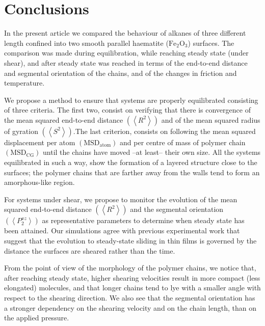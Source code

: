 \documentclass[aps,prb,reprint,superscriptaddress, a4paper]{revtex4-1}
\begin{document}

\section{Conclusions}
\label{sec:Conc}

In the present article we compared the behaviour of alkanes of three different length confined into two smooth parallel haematite ($\text{Fe}_2\text{O}_3$) surfaces. The comparison was made during equilibration, while reaching steady state (under shear), and after steady state was reached in terms of the end-to-end distance and segmental orientation of the chains, and of the changes in friction and temperature.

We propose a method to ensure that systems are properly equilibrated consisting of three criteria. The first two, consist on verifying that there is convergence of the mean squared end-to-end distance $\left(\left< R^2 \right> \right)$ and of  the mean squared radius of gyration $\left(\left< S^2 \right> \right)$.The last criterion, consists on following the mean squared displacement per atom $\left(\text{MSD}_{\text{atom}}\right)$ and per centre of mass of polymer chain $\left(\text{MSD}_{\text{CG}}\right)$ until the chains have moved --at least-- their own size\cite{Auhl2003}. All the systems equilibrated in such a way, show the formation of a  layered structure close to the surfaces; the polymer chains that are farther away  from the walls tend to form an amorphous-like region. 

For systems under shear, we propose to monitor the evolution of the mean squared end-to-end distance $\left(\left< R^2 \right> \right)$ and the segmental orientation $\left(\left<P_{2}^{xz} \right> \right)$ as representative parameters to determine when steady state has been attained. Our simulations  agree with previous experimental work that suggest\cite{Drummond2000} that the  evolution to steady-state sliding in thin films is governed by the distance the surfaces are sheared rather than the time.

From the point of view of the morphology of the polymer chains, we notice that, after reaching steady state, higher shearing velocities result in more compact (less elongated) molecules, and that longer chains tend to  lye  with a smaller angle with respect to the shearing direction.  We also see that the segmental orientation has a stronger dependency on the shearing velocity and on the chain length, than on the applied pressure.
\end{document}

